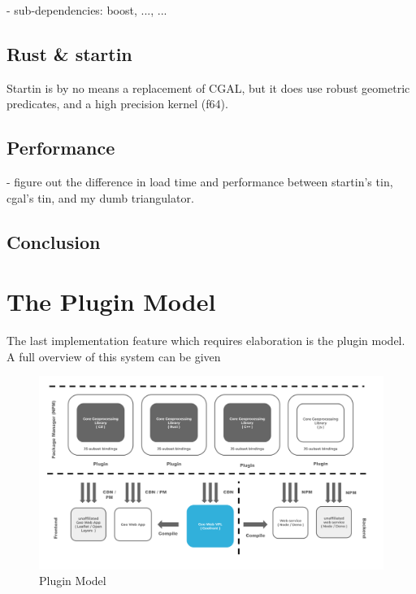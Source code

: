 \begin{note}
- sub-dependencies: boost, ..., ...
\end{note}
  
\subsection{Rust \& startin}

\begin{note}
Startin is by no means a replacement of CGAL, 
but it does use robust geometric predicates, and a high precision kernel (f64).
\end{note}

\subsection{Performance}
- figure out the difference in load time and performance between startin's tin, cgal's tin, and my dumb triangulator.

\subsection{Conclusion}



\newpage
\section{The Plugin Model}
The last implementation feature which requires elaboration is the plugin model. 
A full overview of this system can be given 

\begin{figure}
  \centering
  \graphicspath{ {../../assets/diagrams/} }
  \includegraphics[width=\maxwidth]{Model Proposal.png}
  \caption{Plugin Model}
  \label{fig:method}
\end{figure}


